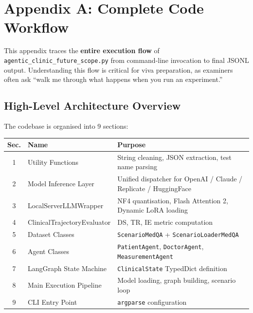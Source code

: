 \clearpage
\section{Appendix A: Complete Code Workflow}
\label{ch:workflow}

This appendix traces the \textbf{entire execution flow} of \texttt{agentic\_clinic\_future\_scope.py} from command-line invocation to final JSONL output. Understanding this flow is critical for viva preparation, as examiners often ask ``walk me through what happens when you run an experiment.''

\subsection{High-Level Architecture Overview}

The codebase is organised into 9 sections:

\begin{center}
\begin{tabular}{@{}clp{9cm}@{}}
\toprule
\textbf{Sec.} & \textbf{Name} & \textbf{Purpose} \\
\midrule
1 & Utility Functions & String cleaning, JSON extraction, test name parsing \\
2 & Model Inference Layer & Unified dispatcher for OpenAI / Claude / Replicate / HuggingFace \\
3 & LocalServerLLMWrapper & NF4 quantisation, Flash Attention 2, Dynamic LoRA loading \\
4 & ClinicalTrajectoryEvaluator & DS, TR, IE metric computation \\
5 & Dataset Classes & \texttt{ScenarioMedQA} + \texttt{ScenarioLoaderMedQA} \\
6 & Agent Classes & \texttt{PatientAgent}, \texttt{DoctorAgent}, \texttt{MeasurementAgent} \\
7 & LangGraph State Machine & \texttt{ClinicalState} TypedDict definition \\
8 & Main Execution Pipeline & Model loading, graph building, scenario loop \\
9 & CLI Entry Point & \texttt{argparse} configuration \\
\bottomrule
\end{tabular}
\end{center}

